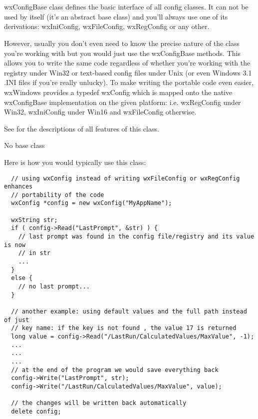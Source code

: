 \section{}\label{wxconfigbase}

wxConfigBase class defines the basic interface of all config classes. It can
not be used by itself (it's an abstract base class) and you'll always use one
of its derivations: wxIniConfig, wxFileConfig, wxRegConfig or any other.

However, usually you don't even need to know the precise nature of the class
you're working with but you would just use the wxConfigBase methods. This
allows you to write the same code regardless of whether you're working with
the registry under Win32 or text-based config files under Unix (or even
Windows 3.1 .INI files if you're really unlucky). To make writing the portable
code even easier, wxWindows provides a typedef wxConfig
which is mapped onto the native wxConfigBase implementation on the given
platform: i.e. wxRegConfig under Win32, wxIniConfig under Win16 and
wxFileConfig otherwise.

See  for the descriptions of all
features of this class.


No base class


Here is how you would typically use this class:

\begin{verbatim}
  // using wxConfig instead of writing wxFileConfig or wxRegConfig enhances
  // portability of the code
  wxConfig *config = new wxConfig("MyAppName");

  wxString str;
  if ( config->Read("LastPrompt", &str) ) {
    // last prompt was found in the config file/registry and its value is now
    // in str
    ...
  }
  else {
    // no last prompt...
  }

  // another example: using default values and the full path instead of just
  // key name: if the key is not found , the value 17 is returned
  long value = config->Read("/LastRun/CalculatedValues/MaxValue", -1);
  ...
  ...
  ...
  // at the end of the program we would save everything back
  config->Write("LastPrompt", str);
  config->Write("/LastRun/CalculatedValues/MaxValue", value);

  // the changes will be written back automatically
  delete config;
\end{verbatim}

